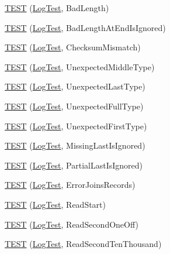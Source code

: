 \begin{DoxyCompactItemize}
\item 
\hyperlink{namespaceleveldb_1_1log_a024a8bc0f558ffe46b3a15ab43018402}{T\+E\+S\+T} (\hyperlink{classleveldb_1_1log_1_1_log_test}{Log\+Test}, Bad\+Length)
\item 
\hyperlink{namespaceleveldb_1_1log_a22b6e6d2a3de82f3e05d63e13f44b9fd}{T\+E\+S\+T} (\hyperlink{classleveldb_1_1log_1_1_log_test}{Log\+Test}, Bad\+Length\+At\+End\+Is\+Ignored)
\item 
\hyperlink{namespaceleveldb_1_1log_a2dccd9d88a61eb0f59fdea07edfe2022}{T\+E\+S\+T} (\hyperlink{classleveldb_1_1log_1_1_log_test}{Log\+Test}, Checksum\+Mismatch)
\item 
\hyperlink{namespaceleveldb_1_1log_ae2aa67608715051976e4cbb2008e3b52}{T\+E\+S\+T} (\hyperlink{classleveldb_1_1log_1_1_log_test}{Log\+Test}, Unexpected\+Middle\+Type)
\item 
\hyperlink{namespaceleveldb_1_1log_ad618b3ff1dc35a8641c019d8eb4a4e8b}{T\+E\+S\+T} (\hyperlink{classleveldb_1_1log_1_1_log_test}{Log\+Test}, Unexpected\+Last\+Type)
\item 
\hyperlink{namespaceleveldb_1_1log_a178460e2ee7a665f0aef08a28217a6d3}{T\+E\+S\+T} (\hyperlink{classleveldb_1_1log_1_1_log_test}{Log\+Test}, Unexpected\+Full\+Type)
\item 
\hyperlink{namespaceleveldb_1_1log_a7c8a46287bbb1e185ccfcb78c5ae94e3}{T\+E\+S\+T} (\hyperlink{classleveldb_1_1log_1_1_log_test}{Log\+Test}, Unexpected\+First\+Type)
\item 
\hyperlink{namespaceleveldb_1_1log_a965e5192bb2f0467f987fe54995d0c89}{T\+E\+S\+T} (\hyperlink{classleveldb_1_1log_1_1_log_test}{Log\+Test}, Missing\+Last\+Is\+Ignored)
\item 
\hyperlink{namespaceleveldb_1_1log_acae9dd4e93ded56d6585082822964b71}{T\+E\+S\+T} (\hyperlink{classleveldb_1_1log_1_1_log_test}{Log\+Test}, Partial\+Last\+Is\+Ignored)
\item 
\hyperlink{namespaceleveldb_1_1log_a2ea9cc0af9f5d8b6bdc74e3126bd389a}{T\+E\+S\+T} (\hyperlink{classleveldb_1_1log_1_1_log_test}{Log\+Test}, Error\+Joins\+Records)
\item 
\hyperlink{namespaceleveldb_1_1log_a6ee7068a33cb134e26e7d1cf58327064}{T\+E\+S\+T} (\hyperlink{classleveldb_1_1log_1_1_log_test}{Log\+Test}, Read\+Start)
\item 
\hyperlink{namespaceleveldb_1_1log_af9cc8dffe50b0cefff163fdca58d1a08}{T\+E\+S\+T} (\hyperlink{classleveldb_1_1log_1_1_log_test}{Log\+Test}, Read\+Second\+One\+Off)
\item 
\hyperlink{namespaceleveldb_1_1log_ab734bca6b78216dc41b112075258dbe7}{T\+E\+S\+T} (\hyperlink{classleveldb_1_1log_1_1_log_test}{Log\+Test}, Read\+Second\+Ten\+Thousand)

\end{DoxyCompactItemize}
